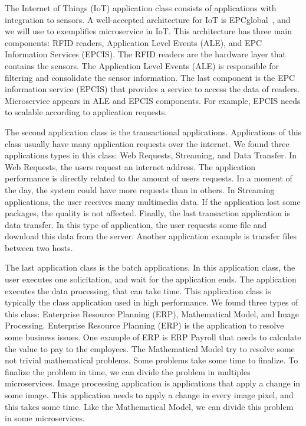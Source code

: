 The Internet of Things (IoT) application class consists of applications with integration to sensors. A well-accepted architecture for IoT is EPCglobal~\cite{ArmenioJohnson2009The1.3}, and we will use to exemplifies microservice in IoT. This architecture has three main components: RFID readers, Application Level Events (ALE), and EPC Information Services (EPCIS). The RFID readers are the hardware layer that contains the sensors. The Application Level Events (ALE) is responsible for filtering and consolidate the sensor information. The last component is the EPC information service (EPCIS) that provides a service to access the data of readers. Microservice appears in ALE and EPCIS components. For example, EPCIS needs to scalable according to application requests.

The second application class is the transactional applications. Applications of this class usually have many application requests over the internet. We found three applications types in this class: Web Requests, Streaming, and Data Transfer. In Web Requests, the users request an internet address. The application performance is directly related to the amount of users requests. In a moment of the day, the system could have more requests than in others. In Streaming applications, the user receives many multimedia data. If the application lost some packages, the quality is not affected. Finally, the last transaction application is data transfer. In this type of application, the user requests some file and download this data from the server. Another application example is transfer files between two hosts.

The last application class is the batch applications. In this application class, the user executes one solicitation, and wait for the application ends. The application executes the data processing, that can take time. This application class is typically the class application used in high performance. We found three types of this class: Enterprise Resource Planning (ERP), Mathematical Model, and Image Processing. Enterprise Resource Planning (ERP) is the application to resolve some business issues. One example of ERP is ERP Payroll that needs to calculate the value to pay to the employees. The Mathematical Model try to resolve some not trivial mathematical problems. Some problems take some time to finalize. To finalize the problem in time, we can divide the problem in multiples microservices. Image processing application is applications that apply a change in some image. This application needs to apply a change in every image pixel, and this takes some time. Like the Mathematical Model, we can divide this problem in some microservices.

